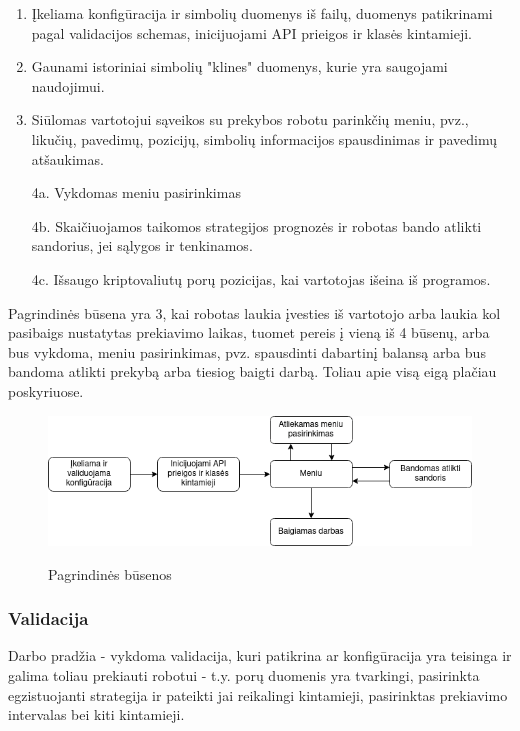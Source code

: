 \documentclass{VUMIFInfKursinis}
\begin{document}
\begin{enumerate}
  \item Įkeliama konfigūracija ir simbolių duomenys iš failų, duomenys patikrinami pagal validacijos schemas, inicijuojami API prieigos ir klasės kintamieji.
  \item Gaunami istoriniai simbolių "klines" duomenys, kurie yra saugojami naudojimui.
  \item Siūlomas vartotojui sąveikos su prekybos robotu parinkčių meniu, pvz., likučių, pavedimų, pozicijų, simbolių informacijos spausdinimas ir pavedimų atšaukimas.
  \item [4a.] Vykdomas meniu pasirinkimas
  \item [4b.] Skaičiuojamos taikomos strategijos prognozės ir robotas bando atlikti sandorius, jei sąlygos ir tenkinamos.
  \item [4c.] Išsaugo kriptovaliutų porų pozicijas, kai vartotojas išeina iš programos.
\end{enumerate}

Pagrindinės būsena yra 3, kai robotas laukia įvesties iš vartotojo arba laukia kol pasibaigs nustatytas prekiavimo laikas, tuomet pereis į vieną iš 4 būsenų, arba bus vykdoma, 
meniu pasirinkimas, pvz. spausdinti dabartinį balansą arba bus bandoma atlikti prekybą arba tiesiog baigti darbą. Toliau apie visą eigą plačiau poskyriuose.

\begin{figure}[H]
  \centering
  \includegraphics[width=.5\textwidth]{img/main_states.png}
  \label{fig:main_states}
  \caption{Pagrindinės būsenos}
\end{figure}

\subsubsection{Validacija}
Darbo pradžia - vykdoma validacija, kuri patikrina ar konfigūracija yra teisinga ir galima toliau prekiauti robotui - t.y.
porų duomenis yra tvarkingi, pasirinkta egzistuojanti strategija ir pateikti jai reikalingi kintamieji, pasirinktas prekiavimo intervalas bei kiti kintamieji.
\end{document}
